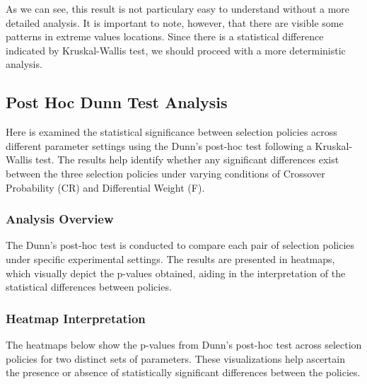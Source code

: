 \documentclass[12pt,a4paper]{article}
\begin{document}
As we can see, this result is not particulary easy to understand without a more detailed analysis.
It is important to note, however, that there are visible some patterns in extreme values locations.
Since there is a statistical difference indicated by Kruskal-Wallis test, we should proceed with a more deterministic analysis.

\subsection{Post Hoc Dunn Test Analysis}
\label{subsec:posthoc-analysis}

Here is examined the statistical significance between selection policies across different parameter settings using the Dunn's post-hoc test following a Kruskal-Wallis test. The results help identify whether any significant differences exist between the three selection policies under varying conditions of Crossover Probability (CR) and Differential Weight (F).

\subsubsection{Analysis Overview}

The Dunn's post-hoc test is conducted to compare each pair of selection policies under specific experimental settings. The results are presented in heatmaps, which visually depict the p-values obtained, aiding in the interpretation of the statistical differences between policies.

\subsubsection{Heatmap Interpretation}

The heatmaps below show the p-values from Dunn's post-hoc test across selection policies for two distinct sets of parameters. These visualizations help ascertain the presence or absence of statistically significant differences between the policies.
\end{document}
